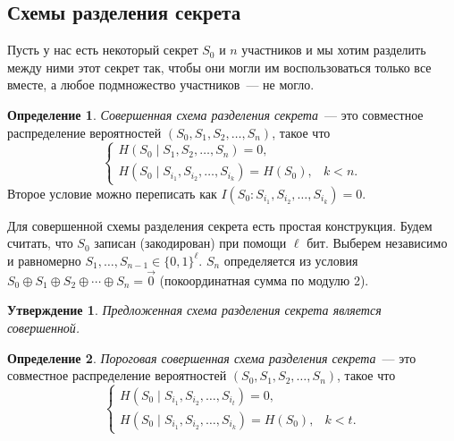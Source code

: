 \documentclass[12pt]{article}
\newcommand{\seqn}[2]{{#1}_1,{#1}_2,\dotsc,{#1}_{#2}}
\newcommand{\seqin}[3]{{#1}_{{#2}_1},{#1}_{{#2}_2},\dotsc,{#1}_{{#2}_{#3}}}
\theoremstyle{definition}
\newtheorem{definition}{Определение}[section]
\theoremstyle{plain}
\newtheorem{statement}{Утверждение}[section]
\theoremstyle{remark}
\begin{document}
\subsection{Схемы разделения секрета}

Пусть у нас есть некоторый секрет $S_0$ и $n$ участников и мы хотим разделить между ними этот секрет
так, чтобы они могли им воспользоваться только все вместе, а любое подмножество участников~--- не
могло.
\begin{definition}
    \emph{Совершенная схема разделения секрета}~--- это совместное распределение вероятностей
    $(S_0,\seqn{S}{n})$, такое что
    \[
    \begin{cases}
        H(S_0\mid\seqn{S}{n}) = 0,\\
        H(S_0\mid\seqin{S}{i}{k}) = H(S_0), & k <  n.
    \end{cases}
    \]
    Второе условие можно переписать как $I(S_0:\seqin{S}{i}{k}) = 0$.
\end{definition}

Для совершенной схемы разделения секрета есть простая конструкция. Будем считать, что $S_0$
записан (закодирован) при помощи $\ell$ бит. Выберем независимо и равномерно
$S_1,\dotsc,S_{n-1}\in\{0,1\}^\ell$. $S_n$ определяется из условия 
$S_0 \oplus S_1 \oplus S_2 \oplus \dotsb \oplus S_n = \vec 0$ (покоординатная сумма по модулю 2).
\begin{statement}
    Предложенная схема разделения секрета является совершенной.
\end{statement}

\begin{definition}
    \emph{Пороговая совершенная схема разделения секрета}~--- это совместное распределение вероятностей
    $(S_0,\seqn{S}{n})$, такое что
    \[
    \begin{cases}
        H(S_0\mid\seqin{S}{i}{t}) = 0,\\
        H(S_0\mid\seqin{S}{i}{k}) = H(S_0), & k < t.
    \end{cases}
    \]
\end{definition}
\end{document}
